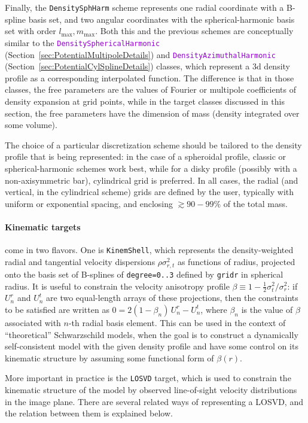 \documentclass[12pt]{article}
\newcommand{\ttt}[1]{\textcolor{darkviolet}{\texttt{#1}}}
\newcommand{\ppp}[1]{\textcolor{darkolive} {\texttt{#1}}}
\begin{document}
Finally, the \ppp{DensitySphHarm} scheme represents one radial coordinate with a B-spline basis set, and two angular coordinates with the spherical-harmonic basis set with order $l_\mathrm{max},m_\mathrm{max}$. Both this and the previous schemes are conceptually similar to the \ttt{Density\-SphericalHarmonic} (Section~\ref{sec:PotentialMultipoleDetails}) and \ttt{DensityAzimuthalHarmonic} (Section~\ref{sec:PotentialCylSplineDetails}) classes, which represent a 3d density profile as a corresponding interpolated function. The difference is that in those classes, the free parameters are the values of Fourier or multipole coefficients of density expansion at grid points, while in the target classes discussed in this section, the free parameters have the dimension of mass (density integrated over some volume).

The choice of a particular discretization scheme should be tailored to the density profile that is being represented: in the case of a spheroidal profile, classic or spherical-harmonic schemes work best, while for a disky profile (possibly with a non-axisymmetric bar), cylindrical grid is preferred. In all cases, the radial (and vertical, in the cylindrical scheme) grids are defined by the user, typically with uniform or exponential spacing, and enclosing $\gtrsim 90-99\%$ of the total mass.

\paragraph{Kinematic targets} come in two flavors. One is \ppp{KinemShell}, which represents the density-weighted radial and tangential velocity dispersions $\rho\sigma_{r,t}^2$ as functions of radius, projected onto the basis set of B-splines of \ppp{degree=0..3} defined by \ppp{gridr} in spherical radius. 
It is useful to constrain the velocity anisotropy profile $\beta\equiv 1 - \frac12 \sigma_t^2/\sigma_r^2$: if $U_n^r$ and $U_n^t$ are two equal-length arrays of these projections, then the constraints to be satisfied are written as $0 = 2(1-\beta_n)\,U_n^r - U_n^t$, where $\beta_n$ is the value of $\beta$ associated with $n$-th radial basis element. This can be used in the context of ``theoretical'' Schwarzschild models, when the goal is to construct a dynamically self-consistent model with the given density profile and have some control on its kinematic structure by assuming some functional form of $\beta(r)$.

More important in practice is the \ppp{LOSVD} target, which is used to constrain the kinematic structure of the model by observed line-of-sight velocity distributions in the image plane. There are several related ways of representing a LOSVD, and the relation between them is explained below.
\end{document}
